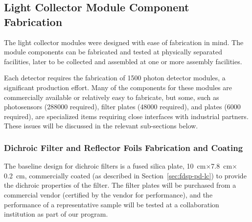 
\subsection{Light Collector Module Component Fabrication}

The  light collector modules were designed with ease of fabrication in mind.  The module components can be fabricated and  tested at physically separated facilities, later to be collected and assembled at one or more assembly facilities.  %


Each  detector requires the fabrication of \num{1500} photon detector modules, a significant production effort.  Many of the components for these modules are commercially available or relatively easy to fabricate, but some, such as photosensors (\num{288000} required), filter plates (\num{48000} required), and  plates (\num{6000} required), are specialized items requiring close interfaces with industrial partners.  These issues will be discussed in the relevant sub-sections below.   

\subsubsection{Dichroic Filter and Reflector Foils Fabrication and Coating}


The baseline design for dichroic filters is 
a fused silica plate,  \SI{10}{cm}$\times$\SI{7.8}{cm}$\times$\SI{0.2}{cm}, commercially coated (as described in Section~\ref{sec:fdsp-pd-lc}) to provide the dichroic properties of the filter.  
The filter plates will be purchased from a commercial vendor (certified by the vendor for performance), and the performance of a representative sample will be tested at a collaboration institution as part of our  program.  

